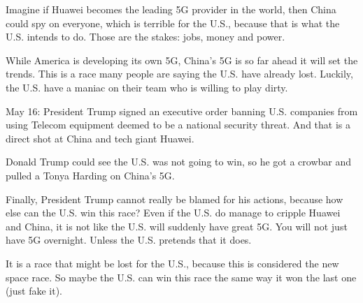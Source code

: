 \item Imagine if Huawei becomes the leading 5G provider in the world, then China could spy on everyone, which is terrible for the U.S., because that is what the U.S. intends to do.
Those are the stakes: jobs, money and power.
\item While America is developing its own 5G, China’s 5G is so far ahead it will set the trends.
This is a race many people are saying the U.S. have already lost. Luckily, the U.S. have a maniac on their team who is willing to play dirty.
\item May 16: President Trump signed an executive order banning U.S. companies from using Telecom equipment deemed to be a national security threat. And that is a direct shot at China and tech giant Huawei.
\item Donald Trump could see the U.S. was not going to win, so he got a crowbar and pulled a Tonya Harding on China’s 5G.
\item Finally, President Trump cannot really be blamed for his actions, because how else can the U.S. win this race? Even if the U.S. do manage to cripple Huawei and China, it is not like the U.S. will suddenly have great 5G. You will not just have 5G overnight. Unless the U.S. pretends that it does.
\item It is a race that might be lost for the U.S., because this is considered the new space race. So maybe the U.S. can win this race the same way it won the last one (just fake it).


